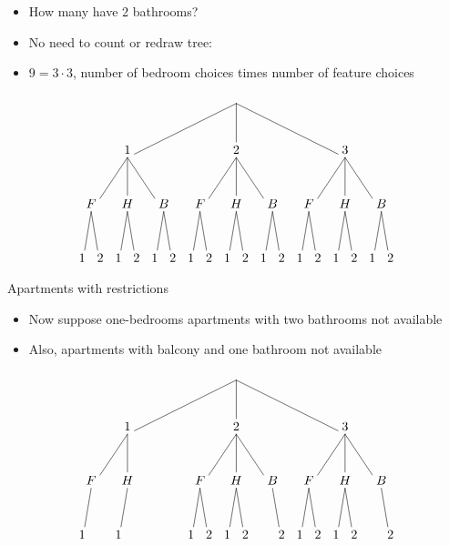 \documentclass[handout]{beamer}
\theoremstyle{definition}
\begin{document}
\begin{frame}
\begin{itemize}
\item How many have 2 bathrooms?
\item No need to count or redraw tree:
\item$ 9=3\cdot 3$, number of bedroom choices times
number of feature choices
\end{itemize}
\[\begin{xy}<.5cm,0cm>:
(8.5,0)="0";
(2.5,-3)="1";
(8.5,-3)="2";
(14.5,-3)="3";
"0";"1"*+!D{1}**\dir{-};
"0";"2"*+!D{2}**\dir{-};
"0";"3"*+!D{3}**\dir{-};
(.5,-6)="11";
(2.5,-6)="12";
(4.5,-6)="13";
(6.5,-6)="21";
(8.5,-6)="22";
(10.5,-6)="23";
(12.5,-6)="31";
(14.5,-6)="32";
(16.5,-6)="33";
"1";"11"*+!D{F}**\dir{-};
"1";"12"*+!D{H}**\dir{-};
"1";"13"*+!D{B}**\dir{-};
"2";"21"*+!D{F}**\dir{-};
"2";"22"*+!D{H}**\dir{-};
"2";"23"*+!D{B}**\dir{-};
"3";"31"*+!D{F}**\dir{-};
"3";"32"*+!D{H}**\dir{-};
"3";"33"*+!D{B}**\dir{-};
"11";(0,-9)*+!D{1}**\dir{-};
"11";(1,-9)*+!D{2}**\dir{-};
"12";(2,-9)*+!D{1}**\dir{-};
"12";(3,-9)*+!D{2}**\dir{-};
"13";(4,-9)*+!D{1}**\dir{-};
"13";(5,-9)*+!D{2}**\dir{-};
"21";(6,-9)*+!D{1}**\dir{-};
"21";(7,-9)*+!D{2}**\dir{-};
"22";(8,-9)*+!D{1}**\dir{-};
"22";(9,-9)*+!D{2}**\dir{-};
"23";(10,-9)*+!D{1}**\dir{-};
"23";(11,-9)*+!D{2}**\dir{-};
"31";(12,-9)*+!D{1}**\dir{-};
"31";(13,-9)*+!D{2}**\dir{-};
"32";(14,-9)*+!D{1}**\dir{-};
"32";(15,-9)*+!D{2}**\dir{-};
"33";(16,-9)*+!D{1}**\dir{-};
"33";(17,-9)*+!D{2}**\dir{-};
\end{xy}\]
\end{frame}

\begin{frame}{Apartments with restrictions}
\begin{itemize}
\item Now suppose one-bedrooms apartments with
two bathrooms not available
\item Also, apartments with balcony and one
bathroom not available
\end{itemize}
\[\begin{xy}<.5cm,0cm>:
(8.5,0)="0";
(2.5,-3)="1";
(8.5,-3)="2";
(14.5,-3)="3";
"0";"1"*+!D{1}**\dir{-};
"0";"2"*+!D{2}**\dir{-};
"0";"3"*+!D{3}**\dir{-};
(.5,-6)="11";
(2.5,-6)="12";
(4.5,-6)="13";
(6.5,-6)="21";
(8.5,-6)="22";
(10.5,-6)="23";
(12.5,-6)="31";
(14.5,-6)="32";
(16.5,-6)="33";
"1";"11"*+!D{F}**\dir{-};
"1";"12"*+!D{H}**\dir{-};
"2";"21"*+!D{F}**\dir{-};
"2";"22"*+!D{H}**\dir{-};
"2";"23"*+!D{B}**\dir{-};
"3";"31"*+!D{F}**\dir{-};
"3";"32"*+!D{H}**\dir{-};
"3";"33"*+!D{B}**\dir{-};
"11";(0,-9)*+!D{1}**\dir{-};
"12";(2,-9)*+!D{1}**\dir{-};
"21";(6,-9)*+!D{1}**\dir{-};
"21";(7,-9)*+!D{2}**\dir{-};
"22";(8,-9)*+!D{1}**\dir{-};
"22";(9,-9)*+!D{2}**\dir{-};
"23";(11,-9)*+!D{2}**\dir{-};
"31";(12,-9)*+!D{1}**\dir{-};
"31";(13,-9)*+!D{2}**\dir{-};
"32";(14,-9)*+!D{1}**\dir{-};
"32";(15,-9)*+!D{2}**\dir{-};
"33";(17,-9)*+!D{2}**\dir{-};
\end{xy}\]
\end{frame}
\end{document}
